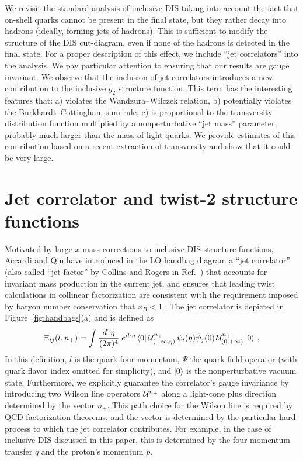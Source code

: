 \documentclass[preprintnumbers,floatfix,nofootinbib]{revtex4}
\newcommand{\de}{d}                    %
\begin{document}
We revisit the standard analysis of inclusive DIS taking into account the fact
that on-shell quarks cannot be present in the final state, but they rather
decay into hadrons (ideally, forming jets of hadrons). This is sufficient to modify the structure of the DIS
cut-diagram, even if none of the hadrons is detected in the final
state. For a proper description of this effect, we include ``jet
correlators'' into the analysis. We pay particular attention to ensuring that our
results are gauge invariant. We observe that the inclusion of jet correlators
introduces a new
contribution to the inclusive $g_2$ structure function. This term has the
interesting features that: a) violates the Wandzura--Wilczek relation, b)
potentially violates the Burkhardt--Cottingham sum rule, c) is
proportional to the transversity distribution function multiplied by a
nonperturbative ``jet mass'' parameter, probably much larger than the mass of light
quarks. 
We provide estimates of this
contribution based on a recent extraction of transversity and show that it
could be very large.   
 

\section{Jet correlator and twist-2 structure functions}

Motivated by large-$x$ mass corrections to inclusive DIS structure functions,
Accardi and Qiu have introduced in the LO handbag diagram 
a ``jet correlator'' (also called ``jet factor'' by Collins and Rogers in Ref.~\cite{Collins:2007ph})
that accounts for invariant mass production in the current jet, and ensures
that leading twist calculations in collinear factorization are consistent with
the requirement imposed by baryon number conservation that $x_B<1$
\cite{Accardi:2008ne}. The jet correlator is depicted in
Figure~\ref{fig:handbags}(a) and is defined as 
\begin{align} 
\Xi_{ij}(l,n_+) =\int
  \frac{\de^4\eta}{(2\pi)^4}\; e^{i l \cdot \eta}\,
    \langle 0|\, {\cal U}^{n_+}_{(+\infty,\eta)}
\,\psi_i(\eta)
             \bar{\psi}_j(0)\,
{\cal U}^{n_+}_{(0,+\infty)}\,   |0 \rangle \ ,
\label{e:xifull}
\end{align} 
In this definition, $l$ is the quark four-momentum, $\Psi$ the quark field
operator (with quark flavor index omitted for simplicity), and $|0\rangle$ is
the nonperturbative vacuum state. Furthermore, we explicitly guarantee the
correlator's gauge invariance by introducing two Wilson line operators ${\cal
  U}^{n_+}$ along a light-cone plus direction determined by the vector
$n_+$. This path choice for the Wilson line is required by QCD factorization
theorems, and the vector is determined by the particular hard process to which
the jet correlator contributes. For example, in the case of inclusive DIS
discussed in this paper, this is determined by the four momentum transfer $q$
and the proton's momentum $p$. 
\end{document}
